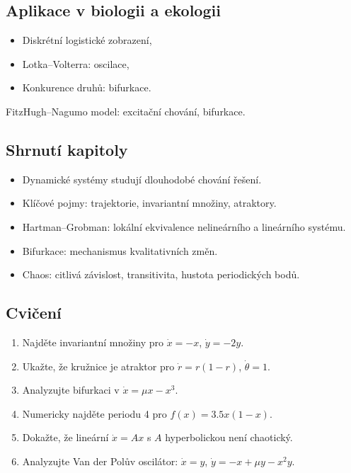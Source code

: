 \spc

\subsection{Aplikace v biologii a ekologii}
\label{sec:aplikace-bio}

\begin{example}
\begin{itemize}
\item Diskrétní logistické zobrazení,
\item Lotka–Volterra: oscilace,
\item Konkurence druhů: bifurkace.
\end{itemize}
\end{example}

\begin{example}
FitzHugh–Nagumo model: excitační chování, bifurkace.
\end{example}

\spc

\subsection*{Shrnutí kapitoly}
\begin{itemize}
\item Dynamické systémy studují dlouhodobé chování řešení.
\item Klíčové pojmy: trajektorie, invariantní množiny, atraktory.
\item Hartman–Grobman: lokální ekvivalence nelineárního a lineárního systému.
\item Bifurkace: mechanismus kvalitativních změn.
\item Chaos: citlivá závislost, transitivita, hustota periodických bodů.
\end{itemize}

\spc

\subsection*{Cvičení}
\begin{enumerate}
\item Najděte invariantní množiny pro $\dot{x}=-x$, $\dot{y}=-2y$.
\item Ukažte, že kružnice je atraktor pro $\dot{r}=r(1-r)$, $\dot{\theta}=1$.
\item Analyzujte bifurkaci v $\dot{x}=\mu x-x^3$.
\item Numericky najděte periodu 4 pro $f(x)=3.5x(1-x)$.
\item Dokažte, že lineární $\dot{x}=Ax$ s $A$ hyperbolickou není chaotický.
\item Analyzujte Van der Polův oscilátor: $\dot{x}=y$, $\dot{y}=-x+\mu y-x^2y$.
\end{enumerate}
